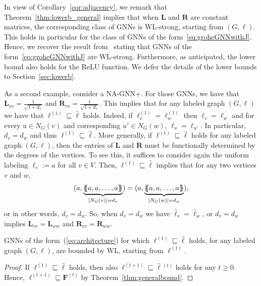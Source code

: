 In view of Corollary~\ref{cor:adjacency}, we remark that Theorem~\ref{thm:lowerb_general} implies that when $\mathbf{L}$ and $\mathbf{R}$ are constant matrices, the corresponding class of GNNs is WL-strong, starting from $(G,\pmb{\ell})$. This holds in particular
for the class of GNNs of the form~\ref{eq:groheGNNwithJ}. Hence, we recover the result from~\cite{grohewl} stating that GNNs of the form~\ref{eq:groheGNNwithJ} are WL-strong. Furthermore, as anticipated, the lower bound also holds for the ReLU function. We defer the details of the lower bounds to Section~\ref{sec:lowerb}.

As a second example, consider a NA-GNN+. For those GNNs, we have that $\mathbf{L}_{vv}=\frac{1}{\sqrt{1+d_v}}$
and $\mathbf{R}_{vv}=\frac{1}{\sqrt{1+d_v}}$. This implies that
for any labeled graph $(G,\pmb{\ell})$ we have that $\pmb{\ell}^{(1)}\sqsubseteq\hat{\pmb{\ell}}$
holds. Indeed, if $\pmb{\ell}^{(1)}_v=\pmb{\ell}^{(1)}_w$ then $\pmb{\ell}_v=\pmb{\ell}_w$ and for every $u\in N_G(v)$ and corresponding $u'\in N_G(w)$,
$\pmb{\ell}_u=\pmb{\ell}_{u'}$. In particular, $d_{v}=d_w$ and thus  $\pmb{\ell}^{(1)}\sqsubseteq\hat{\pmb{\ell}}$. More generally, if $\pmb{\ell}^{(1)}\sqsubseteq\hat{\pmb{\ell}}$ holds for any labeled graph $(G,\pmb{\ell})$,
then the entries of $\mathbf{L}$ and $\mathbf{R}$ must be functionally determined by the
degrees of the vertices. To see this, it suffices to consider again the uniform labeling
$\pmb{\ell}_v:=a$ for all $v\in V$. Then, $\pmb{\ell}^{(1)}\sqsubseteq\hat{\pmb{\ell}}$ implies that
for any two vertices $v$ and $w$, 
$$(a,\underbrace{\ldbl a, a,\ldots, a\rdbl}_{|N_G(v)|=d_v})=
(a,\underbrace{\ldbl a, a,\ldots, a\rdbl}_{|N_G(w)|=d_w}),$$
or in other words, $d_v=d_w$. So, when  $d_v=d_w$ we have $\hat{\pmb{\ell}}_v=\hat{\pmb{\ell}}_w$, or $d_v=d_w$ implies $\mathbf{L}_{vv}=\mathbf{L}_{ww}$ and $\mathbf{R}_{vv}=\mathbf{R}_{ww}$.

\begin{corollary}\label{cor:augmented2}
GNNs of the form~(\ref{eq:architecture}) for which 
$\pmb{\ell}^{(1)}\sqsubseteq\hat{\pmb{\ell}}$ holds, for any labeled graph $(G,\pmb{\ell})$, are bounded by WL, starting from $\pmb{\ell}^{(1)}$. 
\end{corollary}
\begin{proof}
If 	$\pmb{\ell}^{(1)}\sqsubseteq\hat{\pmb{\ell}}$ holds, then also 
$\pmb{\ell}^{(t+1)}\sqsubseteq\hat{\pmb{\ell}}{}^{(t)}$ holds for any $t\geq 0$. Hence,
$\pmb{\ell}^{(t+1)}\sqsubseteq \mathbf{F}^{(t)}$ 
by Theorem~\ref{thm:generalbound}.
\end{proof}

